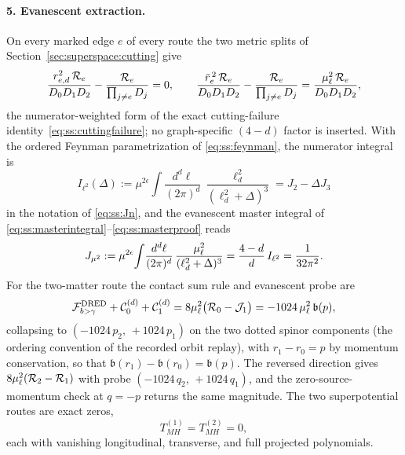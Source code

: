 \paragraph{5. Evanescent extraction.} On every marked edge $e$ of every route the two metric splits of
Section~\ref{sec:superspace:cutting} give
\begin{equation}\label{eq:bg:edge}
\frac{r_{e,d}^{2}\,\mathcal R_{e}}{D_{0}D_{1}D_{2}} -\frac{\mathcal R_{e}}{\prod_{j\neq e}D_{j}}=0, \qquad \frac{\bar r_{e}^{\,2}\,\mathcal R_{e}}{D_{0}D_{1}D_{2}} -\frac{\mathcal R_{e}}{\prod_{j\neq e}D_{j}} =\frac{\mu_\ell^{2}\,\mathcal R_{e}}{D_{0}D_{1}D_{2}} ,
\end{equation}
the numerator-weighted form of the exact cutting-failure identity~\eqref{eq:ss:cuttingfailure}; no graph-specific
$(4-d)$ factor is inserted. With the ordered Feynman parametrization of \eqref{eq:ss:feynman}, the numerator
integral is
\begin{equation}\label{eq:bg:i2}
I_{\ell^{2}}(\Delta) :=\mu^{2\epsilon}\!\int\!\frac{d^{d}\ell}{(2\pi)^{d}}\, \frac{\ell_{d}^{2}}{(\ell_{d}^{2}+\Delta)^{3}} =J_{2}-\Delta J_{3}
\end{equation}
in the notation of \eqref{eq:ss:Jn}, and the evanescent master integral of
\eqref{eq:ss:masterintegral}--\eqref{eq:ss:masterproof} reads
\begin{equation}\label{eq:bg:jmu2}
J_{\mu^{2}} :=\mu^{2\epsilon}\!\int\!\frac{d^{d}\ell}{(2\pi)^{d}}\, \frac{\mu_\ell^{2}}{(\ell_{d}^{2}+\Delta)^{3}} =\frac{4-d}{d}\,I_{\ell^{2}} =\frac{1}{32\pi^{2}} .
\end{equation}
For the two-matter route the contact sum rule and evanescent probe are
\begin{equation}\label{eq:bg:sumrule}
\mathcal F^{\mathrm{DRED}}_{b>\gamma} +\mathcal C^{(d)}_{0}+\mathcal C^{(d)}_{1} =8\mu_\ell^{2}\big(\mathcal R_{0}-\mathcal J_{1}\big) =-1024\,\mu_\ell^{2}\,\mathfrak b(p) ,
\end{equation}
collapsing to $(-1024\,p_{\dot2},\,+1024\,p_{\dot1})$ on the two dotted spinor components (the ordering convention of
the recorded orbit replay), with $r_{1}-r_{0}=p$ by momentum conservation, so that $\mathfrak b(r_{1})-\mathfrak
b(r_{0})=\mathfrak b(p)$. The reversed direction gives $8\mu_\ell^{2}(\mathcal R_{2}-\mathcal R_{1})$ with probe
$(-1024\,q_{\dot2},\,+1024\,q_{\dot1})$, and the zero-source-momentum check at $q=-p$ returns the same magnitude.
The two superpotential routes are exact zeros,
\begin{equation}\label{eq:bg:tmh}
T_{MH}^{(1)}=T_{MH}^{(2)}=0 ,
\end{equation}
each with vanishing longitudinal, transverse, and full projected polynomials.

